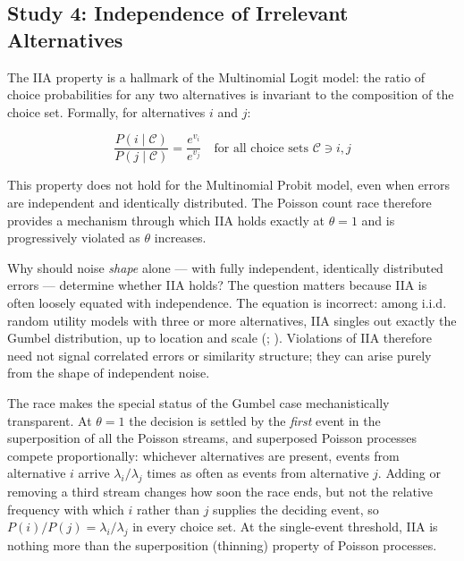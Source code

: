 \documentclass[
  man,
  floatsintext,
  longtable,
  a4paper,
  nolmodern,
  notxfonts,
  notimes,
  colorlinks=true,linkcolor=blue,citecolor=blue,urlcolor=blue]{apa7}
\begin{document}
\subsection{Study 4: Independence of Irrelevant
Alternatives}\label{study-4-independence-of-irrelevant-alternatives}

The IIA property is a hallmark of the Multinomial Logit model: the ratio
of choice probabilities for any two alternatives is invariant to the
composition of the choice set. Formally, for alternatives \(i\) and
\(j\):

\[\frac{P(i \mid \mathcal{C})}{P(j \mid \mathcal{C})} = \frac{e^{v_i}}{e^{v_j}} \quad \text{for all choice sets } \mathcal{C} \ni i, j\]

This property does not hold for the Multinomial Probit model, even when
errors are independent and identically distributed. The Poisson count
race therefore provides a mechanism through which IIA holds exactly at
\(\theta = 1\) and is progressively violated as \(\theta\) increases.

Why should noise \emph{shape} alone --- with fully independent,
identically distributed errors --- determine whether IIA holds? The
question matters because IIA is often loosely equated with independence.
The equation is incorrect: among i.i.d. random utility models with three
or more alternatives, IIA singles out exactly the Gumbel distribution,
up to location and scale
(;
).
Violations of IIA therefore need not signal correlated errors or
similarity structure; they can arise purely from the shape of
independent noise.

The race makes the special status of the Gumbel case mechanistically
transparent. At \(\theta = 1\) the decision is settled by the
\emph{first} event in the superposition of all the Poisson streams, and
superposed Poisson processes compete proportionally: whichever
alternatives are present, events from alternative \(i\) arrive
\(\lambda_i/\lambda_j\) times as often as events from alternative \(j\).
Adding or removing a third stream changes how soon the race ends, but
not the relative frequency with which \(i\) rather than \(j\) supplies
the deciding event, so \(P(i)/P(j) = \lambda_i/\lambda_j\) in every
choice set. At the single-event threshold, IIA is nothing more than the
superposition (thinning) property of Poisson processes.
\end{document}
